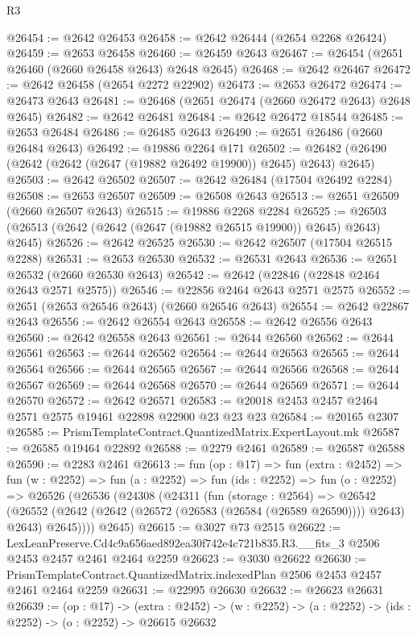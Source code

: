 \begin{lexlean}{R3}
\begin{coremodule}
@26454 := @2642 @26453
@26458 := @2642 @26444 (@2654 @2268 @26424)
@26459 := @2653 @26458
@26460 := @26459 @2643
@26467 := @26454 (@2651 @26460 (@2660 @26458 @2643) @2648 @2645)
@26468 := @2642 @26467
@26472 := @2642 @26458 (@2654 @2272 @22902)
@26473 := @2653 @26472
@26474 := @26473 @2643
@26481 := @26468 (@2651 @26474 (@2660 @26472 @2643) @2648 @2645)
@26482 := @2642 @26481
@26484 := @2642 @26472 @18544
@26485 := @2653 @26484
@26486 := @26485 @2643
@26490 := @2651 @26486 (@2660 @26484 @2643)
@26492 := @19886 @2264 @171
@26502 := @26482 (@26490 (@2642 (@2642 (@2647 (@19882 @26492 @19900)) @2645) @2643) @2645)
@26503 := @2642 @26502
@26507 := @2642 @26484 (@17504 @26492 @2284)
@26508 := @2653 @26507
@26509 := @26508 @2643
@26513 := @2651 @26509 (@2660 @26507 @2643)
@26515 := @19886 @2268 @2284
@26525 := @26503 (@26513 (@2642 (@2642 (@2647 (@19882 @26515 @19900)) @2645) @2643) @2645)
@26526 := @2642 @26525
@26530 := @2642 @26507 (@17504 @26515 @2288)
@26531 := @2653 @26530
@26532 := @26531 @2643
@26536 := @2651 @26532 (@2660 @26530 @2643)
@26542 := @2642 (@22846 (@22848 @2464 @2643 @2571 @2575))
@26546 := @22856 @2464 @2643 @2571 @2575
@26552 := @2651 (@2653 @26546 @2643) (@2660 @26546 @2643)
@26554 := @2642 @22867 @2643
@26556 := @2642 @26554 @2643
@26558 := @2642 @26556 @2643
@26560 := @2642 @26558 @2643
@26561 := @2644 @26560
@26562 := @2644 @26561
@26563 := @2644 @26562
@26564 := @2644 @26563
@26565 := @2644 @26564
@26566 := @2644 @26565
@26567 := @2644 @26566
@26568 := @2644 @26567
@26569 := @2644 @26568
@26570 := @2644 @26569
@26571 := @2644 @26570
@26572 := @2642 @26571
@26583 := @20018 @2453 @2457 @2464 @2571 @2575 @19461 @22898 @22900 @23 @23 @23
@26584 := @20165 @2307
@26585 := PrismTemplateContract.QuantizedMatrix.ExpertLayout.mk
@26587 := @26585 @19464 @22892
@26588 := @2279 @2461
@26589 := @26587 @26588
@26590 := @2283 @2461
@26613 := fun (op : @17) =>
  fun (extra : @2452) =>
  fun (w : @2252) =>
  fun (a : @2252) =>
  fun (ids : @2252) =>
  fun (o : @2252) =>
  @26526
    (@26536
      (@24308
        (@24311
          (fun (storage : @2564) =>
          @26542
            (@26552 (@2642 (@2642 (@26572 (@26583 (@26584 (@26589 @26590)))) @2643) @2643) @2645))))
      @2645)
@26615 := @3027 @73 @2515
@26622 := LexLeanPreserve.Cd4c9a656aed892ea30f742e4c721b835.R3.__fits_3
    @2506
    @2453
    @2457
    @2461
    @2464
    @2259
@26623 := @3030 @26622
@26630 := PrismTemplateContract.QuantizedMatrix.indexedPlan @2506 @2453 @2457 @2461 @2464 @2259
@26631 := @22995 @26630
@26632 := @26623 @26631
@26639 := (op : @17) ->
  (extra : @2452) -> (w : @2252) -> (a : @2252) -> (ids : @2252) -> (o : @2252) -> @26615 @26632

\end{coremodule}
\end{lexlean}
